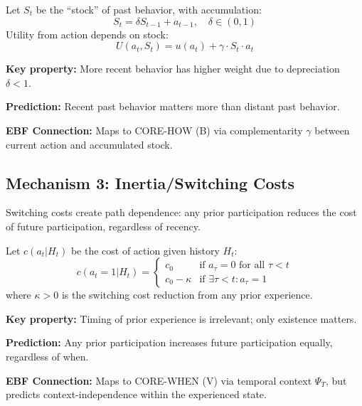 \begin{tcolorbox}[colback=gray!5!white, colframe=gray!75!black,
    title=Definition: Addiction/Reinforcement]
Let $S_t$ be the ``stock'' of past behavior, with accumulation:
\begin{equation}
S_t = \delta S_{t-1} + a_{t-1}, \quad \delta \in (0,1)
\end{equation}
Utility from action depends on stock:
\begin{equation}
U(a_t, S_t) = u(a_t) + \gamma \cdot S_t \cdot a_t
\end{equation}

\textbf{Key property:} More recent behavior has higher weight due to depreciation $\delta < 1$.
\end{tcolorbox}

\textbf{Prediction:} Recent past behavior matters more than distant past behavior.

\textbf{EBF Connection:} Maps to CORE-HOW (B) via complementarity $\gamma$ between current
action and accumulated stock.

\subsection{Mechanism 3: Inertia/Switching Costs}

Switching costs create path dependence: any prior participation reduces the cost of
future participation, regardless of recency.

\begin{tcolorbox}[colback=gray!5!white, colframe=gray!75!black,
    title=Definition: Inertia/Switching Costs]
Let $c(a_t | H_t)$ be the cost of action given history $H_t$:
\begin{equation}
c(a_t = 1 | H_t) = \begin{cases}
c_0 & \text{if } a_\tau = 0 \text{ for all } \tau < t \\
c_0 - \kappa & \text{if } \exists \tau < t: a_\tau = 1
\end{cases}
\end{equation}
where $\kappa > 0$ is the switching cost reduction from any prior experience.

\textbf{Key property:} Timing of prior experience is irrelevant; only existence matters.
\end{tcolorbox}

\textbf{Prediction:} Any prior participation increases future participation equally, regardless of when.

\textbf{EBF Connection:} Maps to CORE-WHEN (V) via temporal context $\Psi_T$, but
predicts context-independence within the experienced state.


